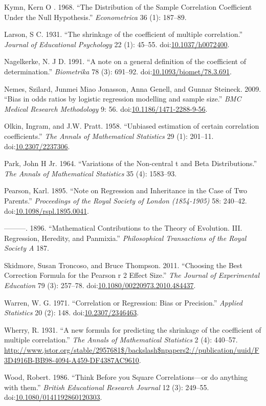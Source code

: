 \documentclass[]{article}
\begin{document}
\hypertarget{ref-Kymn1968}{}
Kymn, Kern O . 1968. ``The Distribution of the Sample Correlation
Coefficient Under the Null Hypothesis.'' \emph{Econometrica} 36 (1):
187--89.

\hypertarget{ref-Larson1931}{}
Larson, S C. 1931. ``The shrinkage of the coefficient of multiple
correlation.'' \emph{Journal of Educational Psychology} 22 (1): 45--55.
doi:\href{https://doi.org/10.1037/h0072400}{10.1037/h0072400}.

\hypertarget{ref-Nagelkerke1991}{}
Nagelkerke, N. J D. 1991. ``A note on a general definition of the
coefficient of determination.'' \emph{Biometrika} 78 (3): 691--92.
doi:\href{https://doi.org/10.1093/biomet/78.3.691}{10.1093/biomet/78.3.691}.

\hypertarget{ref-Nemes2009}{}
Nemes, Szilard, Junmei Miao Jonasson, Anna Genell, and Gunnar Steineck.
2009. ``Bias in odds ratios by logistic regression modelling and sample
size.'' \emph{BMC Medical Research Methodology} 9: 56.
doi:\href{https://doi.org/10.1186/1471-2288-9-56}{10.1186/1471-2288-9-56}.

\hypertarget{ref-Olkin1958}{}
Olkin, Ingram, and J.W. Pratt. 1958. ``Unbiased estimation of certain
correlation coefficients.'' \emph{The Annals of Mathematical Statistics}
29 (1): 201--11.
doi:\href{https://doi.org/10.2307/2237306}{10.2307/2237306}.

\hypertarget{ref-Park1964}{}
Park, John H Jr. 1964. ``Variations of the Non-central t and Beta
Distributions.'' \emph{The Annals of Mathematical Statistics} 35 (4):
1583--93.

\hypertarget{ref-Pearson1895}{}
Pearson, Karl. 1895. ``Note on Regression and Inheritance in the Case of
Two Parents.'' \emph{Proceedings of the Royal Society of London
(1854-1905)} 58: 240--42.
doi:\href{https://doi.org/10.1098/rspl.1895.0041}{10.1098/rspl.1895.0041}.

\hypertarget{ref-Pearson1896}{}
---------. 1896. ``Mathematical Contributions to the Theory of
Evolution. III. Regression, Heredity, and Panmixia.''
\emph{Philosophical Transactions of the Royal Society A} 187.

\hypertarget{ref-Skidmore2011}{}
Skidmore, Susan Troncoso, and Bruce Thompson. 2011. ``Choosing the Best
Correction Formula for the Pearson r 2 Effect Size.'' \emph{The Journal
of Experimental Education} 79 (3): 257--78.
doi:\href{https://doi.org/10.1080/00220973.2010.484437}{10.1080/00220973.2010.484437}.

\hypertarget{ref-Warren1971}{}
Warren, W. G. 1971. ``Correlation or Regression: Bias or Precision.''
\emph{Applied Statistics} 20 (2): 148.
doi:\href{https://doi.org/10.2307/2346463}{10.2307/2346463}.

\hypertarget{ref-Wherry1931}{}
Wherry, R. 1931. ``A new formula for predicting the shrinkage of the
coefficient of multiple correlation.'' \emph{The Annals of Mathematical
Statistics} 2 (4): 440--57.
\url{http://www.jstor.org/stable/2957681$/backslash$npapers2://publication/uuid/F3D4916B-BB98-4094-A459-DF4387AC9610}.

\hypertarget{ref-Wood1986}{}
Wood, Robert. 1986. ``Think Before you Square Correlations---or do
anything with them.'' \emph{British Educational Research Journal} 12
(3): 249--55.
doi:\href{https://doi.org/10.1080/0141192860120303}{10.1080/0141192860120303}.
\end{document}
